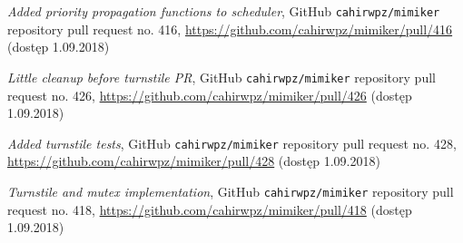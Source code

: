 \documentclass[shortabstract]{iithesis}
\theoremstyle{definition} \newtheorem*{definition}{Definicja}
\theoremstyle{definition} \newtheorem*{example}{Przykład}
\theoremstyle{definition} \newtheorem*{remark}{Uwaga}
\begin{document}
\begin{thebibliography}{99}
\textit{Added priority propagation functions to scheduler},
GitHub \texttt{cahirwpz/mimiker} repository pull request no. 416,
\url{https://github.com/cahirwpz/mimiker/pull/416}
(dostęp 1.09.2018)

\textit{Little cleanup before turnstile PR},
GitHub \texttt{cahirwpz/mimiker} repository pull request no. 426,
\url{https://github.com/cahirwpz/mimiker/pull/426}
(dostęp 1.09.2018)

\textit{Added turnstile tests},
GitHub \texttt{cahirwpz/mimiker} repository pull request no. 428,
\url{https://github.com/cahirwpz/mimiker/pull/428}
(dostęp 1.09.2018)

\textit{Turnstile and mutex implementation},
GitHub \texttt{cahirwpz/mimiker} repository pull request no. 418,
\url{https://github.com/cahirwpz/mimiker/pull/418}
(dostęp 1.09.2018)

\end{thebibliography}
\end{document}

